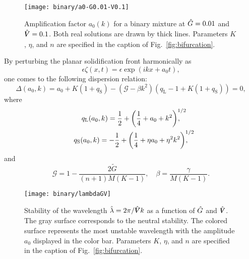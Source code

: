 \documentclass{article}
\newcommand{\liq}{\text{L}}
\newcommand{\sol}{\text{S}}
\newcommand{\qL}{q_\liq}
\newcommand{\qS}{q_\sol}
\newcommand{\hV}[1][\qty(\bar{V})]{\vphantom{#1}\mathrlap{\smash{\hat{V}}}V}
\newcommand{\hG}[1][\qty(\bar{G})]{\vphantom{#1}\smash{\hat{G}}}
\begin{document}
\begin{figure}
    \centering
    \texttt{[image: binary/a0-G0.01-V0.1]}
    \caption{
        Amplification factor $a_0(k)$ for a binary mixture at $\hG=0.01$ and $\hV=0.1$.
        Both real solutions are drawn by thick lines.
        Parameters $K$, $\eta$, and $n$ are specified in the caption of Fig.~\ref{fig:bifurcation}.
    }\label{fig:binary:a0}
\end{figure}

By perturbing the planar solidification front harmonically as
\begin{equation}\label{eq:binary:perturbation}
    \epsilon\zeta(x,t) = \epsilon\exp(ikx + a_0t),
\end{equation}
one comes to the following dispersion relation:
\begin{equation}\label{eq:binary:a_0}
    \Delta(a_0,k) = a_0 + K(1+\qS) - (\mathcal{G}-\beta k^2)(\qL-1 + K(1+\qS)) = 0,
\end{equation}
where
\begin{gather}
    \qL(a_0,k) = \frac12 + \qty(\frac14 + a_0 + k^2)^{\mathrlap{1/2}}, \label{eq:binary:qL}\\
    \qS(a_0,k) = -\frac12 + \qty(\frac14 + \eta a_0 + \eta^2k^2)^{\mathrlap{1/2}}, \label{eq:binary:qS}
\end{gather}
and
\begin{equation}\label{eq:Gbeta}
    \mathcal{G} = 1 - \frac{2\tilde{G}}{(n+1)M(K-1)}, \quad
    \beta = \frac{\gamma}{M(K-1)}.
\end{equation}

\begin{figure}
    \centering
    \vspace{-80pt}
    \texttt{[image: binary/lambdaGV]}
    \caption{
        Stability of the wavelength $\hat\lambda=2\pi/\hV k$ as a function of $\hG$ and $\hV$.
        The gray surface corresponds to the neutral stability.
        The colored surface represents the most unstable wavelength with the amplitude $a_0$ displayed in the color bar.
        Parameters $K$, $\eta$, and $n$ are specified in the caption of Fig.~\ref{fig:bifurcation}.
    }\label{fig:binary:lambdaGV}
\end{figure}
\end{document}

